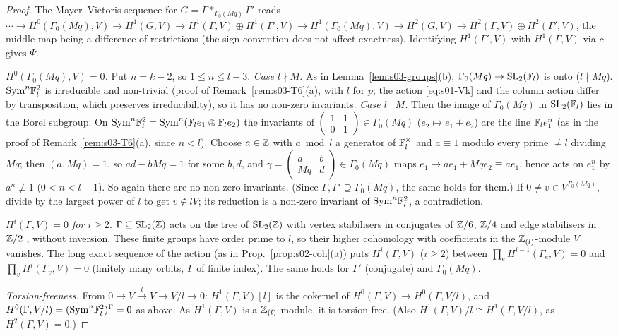 \begin{proof}
The Mayer--Vietoris sequence for $G=\Gamma*_{\Gamma_0(Mq)}\Gamma'$ reads
$\cdots\to H^0(\Gamma_0(Mq),V)\to H^1(G,V)\to H^1(\Gamma,V)\oplus H^1(\Gamma',V)\to H^1(\Gamma_0(Mq),V)\to H^2(G,V)\to H^2(\Gamma,V)\oplus H^2(\Gamma',V)$, the middle map
being a difference of restrictions (the sign convention does not affect exactness). Identifying $H^1(\Gamma',V)$ with $H^1(\Gamma,V)$ via $c$ gives $\Psi$.

\emph{$H^0(\Gamma_0(Mq),V)=0$.} Put $n=k-2$, so $1\le n\le l-3$. \emph{Case $l\nmid M$.} As in Lemma~\ref{lem:s03-groups}(b), $\Gamma_0(Mq)\to\mathrm{SL}_2(\mathbb{F}_l)$ is onto
($l\nmid Mq$). $\mathrm{Sym}^n\mathbb{F}_l^2$ is irreducible and non-trivial (proof of Remark~\ref{rem:s03-T6}(a), with $l$ for $p$; the action \eqref{eq:s01-Vk} and the column action
differ by transposition, which preserves irreducibility), so it has no non-zero invariants. \emph{Case $l\mid M$.} Then the image of $\Gamma_0(Mq)$ in $\mathrm{SL}_2(\mathbb{F}_l)$ lies in the Borel
subgroup. On $\mathrm{Sym}^n\mathbb{F}_l^2=\mathrm{Sym}^n(\mathbb{F}_le_1\oplus\mathbb{F}_le_2)$ the invariants of $\left(\begin{smallmatrix}1&1\\0&1\end{smallmatrix}\right)\in\Gamma_0(Mq)$ ($e_2\mapsto e_1+e_2$)
are the line $\mathbb{F}_le_1^n$ (as in the proof of Remark~\ref{rem:s03-T6}(a), since $n<l$). Choose $a\in\mathbb{Z}$ with $a\bmod l$ a generator of $\mathbb{F}_l^\times$ and $a\equiv1$ modulo
every prime $\ne l$ dividing $Mq$; then $(a,Mq)=1$, so $ad-bMq=1$ for some $b,d$, and $\gamma=\left(\begin{smallmatrix}a&b\\Mq&d\end{smallmatrix}\right)\in\Gamma_0(Mq)$ maps
$e_1\mapsto ae_1+Mqe_2\equiv ae_1$, hence acts on $e_1^n$ by $a^n\not\equiv1$ ($0<n<l-1$). So again there are no non-zero invariants.
(Since $\Gamma,\Gamma'\supseteq\Gamma_0(Mq)$, the same holds for them.) If $0\ne v\in V^{\Gamma_0(Mq)}$, divide by the largest power of $l$ to get $v\notin lV$; its reduction is a non-zero invariant of
$\mathrm{Sym}^n\mathbb{F}_l^2$, a contradiction.

\emph{$H^i(\Gamma,V)=0$ for $i\ge2$.} $\Gamma\subseteq\mathrm{SL}_2(\mathbb{Z})$ acts on the tree of $\mathrm{SL}_2(\mathbb{Z})$ with vertex stabilisers in conjugates of $\mathbb{Z}/6$, $\mathbb{Z}/4$ and edge stabilisers in
$\mathbb{Z}/2$ , without inversion. These finite groups have order prime to $l$, so their higher cohomology with coefficients in the
$\mathbb{Z}_{(l)}$-module $V$ vanishes. The long exact sequence of the action (as in Prop.~\ref{prop:s02-coh}(a)) puts $H^i(\Gamma,V)$ ($i\ge2$) between
$\prod_eH^{i-1}(\Gamma_e,V)=0$ and $\prod_vH^i(\Gamma_v,V)=0$ (finitely many orbits, $\Gamma$ of finite index). The same holds for $\Gamma'$ (conjugate) and $\Gamma_0(Mq)$.

\emph{Torsion-freeness.} From $0\to V\xrightarrow{l}V\to V/l\to0$: $H^1(\Gamma,V)[l]$ is the cokernel of $H^0(\Gamma,V)\to H^0(\Gamma,V/l)$, and
$H^0(\Gamma,V/l)=(\mathrm{Sym}^n\mathbb{F}_l^2)^\Gamma=0$ as above. As $H^1(\Gamma,V)$ is a $\mathbb{Z}_{(l)}$-module, it is torsion-free. (Also $H^1(\Gamma,V)/l\cong H^1(\Gamma,V/l)$, as
$H^2(\Gamma,V)=0$.)
\end{proof}

